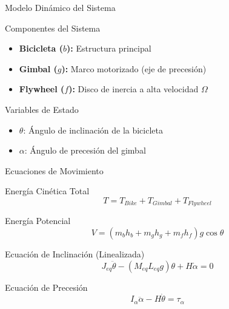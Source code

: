 \documentclass[10pt,xcolor={dvipsnames}]{beamer}
\begin{document}
\begin{frame}{Modelo Dinámico del Sistema}
\begin{block}{Componentes del Sistema}
\begin{itemize}
    \item \textbf{Bicicleta ($b$):} Estructura principal
    \item \textbf{Gimbal ($g$):} Marco motorizado (eje de precesión)
    \item \textbf{Flywheel ($f$):} Disco de inercia a alta velocidad $\Omega$
\end{itemize}
\end{block}

\vspace{0.2cm}
\begin{center}
\end{center}

\begin{block}{Variables de Estado}
\begin{itemize}
    \item $\theta$: Ángulo de inclinación de la bicicleta
    \item $\alpha$: Ángulo de precesión del gimbal
\end{itemize}
\end{block}
\end{frame}

\begin{frame}{Ecuaciones de Movimiento}
\begin{block}{Energía Cinética Total}
\begin{equation*}
T = T_{Bike} + T_{Gimbal} + T_{Flywheel}
\end{equation*}
\end{block}

\begin{block}{Energía Potencial}
\begin{equation*}
V = (m_b h_b + m_g h_g + m_f h_f) g \cos\theta
\end{equation*}
\end{block}

\begin{block}{Ecuación de Inclinación (Linealizada)}
\begin{equation*}
J_{eq}\ddot{\theta} - (M_{eq}L_{eq}g)\theta + H\dot{\alpha} = 0
\end{equation*}
\end{block}

\begin{block}{Ecuación de Precesión}
\begin{equation*}
I_\alpha \ddot{\alpha} - H\dot{\theta} = \tau_\alpha
\end{equation*}
\end{block}
\end{frame}
\end{document}
